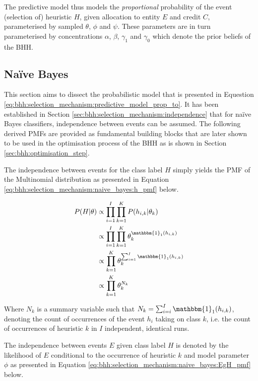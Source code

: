 The predictive model thus models the \textit{proportional} probability of the event (selection of) heuristic $H$, given allocation to entity $E$ and credit $C$, parameterised by sampled $\theta$, $\phi$ and $\psi$. These parameters are in turn parameterised by concentrations $\alpha$, $\beta$, $\gamma_{1}$ and $\gamma_{0}$ which denote the prior beliefs of the \ac{BHH}.


\subsection{Naïve Bayes}
\label{sec:bhh:selection_mechanism:naive_bayes}

This section aims to dissect the probabilistic model that is presented in Equestion \ref{eq:bhh:selection_mechanism:predictive_model_prop_to}. It has been established in Section \ref{sec:bhh:selection_mechanism:independence} that for  naïve Bayes classifiers, independence between events can be assumed. The following derived \acp{PMF} are provided as fundamental building blocks that are later shown to be used in the optimisation process of the \ac{BHH} as is shown in Section \ref{sec:bhh:optimisation_step}.

The independence between events for the class label $H$ simply yields the \ac{PMF} of the Multinomial distribution as presented in Equation \ref{eq:bhh:selection_mechanism:naive_bayes:h_pmf} below.

\begin{equation}
    \label{eq:bhh:selection_mechanism:naive_bayes:h_pmf}
    \begin{split}
        P(H \vert \theta)
        &\propto \prod_{i=1}^{I} \prod_{k=1}^{K} P(h_{i,k} \vert \theta_{k}) \\
        &\propto \prod_{i=1}^{I} \prod_{k=1}^{K} \theta_{k}^{\mathbbm{1}_{1}(h_{i,k})} \\
        &\propto \prod_{k=1}^{K} \theta_{k}^{\sum_{i=1}^{I} \mathbbm{1}_{1}(h_{i,k})} \\
        &\propto \prod_{k=1}^{K} \theta_{k}^{N_{k}}
    \end{split}
\end{equation}

Where $N_{k}$ is a summary variable such that $N_{k} = \sum_{i=i}^{I}
\mathbbm{1}_{1}(h_{i,k})$, denoting the count of occurrences of the event
$h_{i}$ taking on class $k$, i.e. the count of occurrences of heuristic $k$ in
$I$ independent, identical runs.

The independence between events $E$ given class label $H$ is denoted by the likelihood of $E$
conditional to the occurrence of heuristic $k$ and model parameter $\phi$ as
presented in Equation \ref{eq:bhh:selection_mechanism:naive_bayes:EgH_pmf} below.

